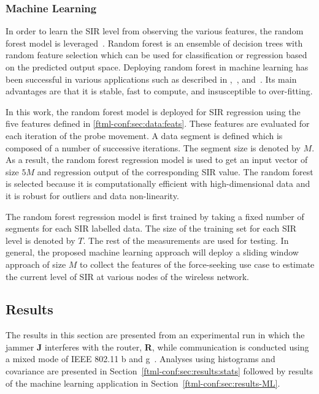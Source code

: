 \subsubsection{Machine Learning}\label{ftml-conf:sec:data:ML}
In order to learn the SIR level from observing the various features, the random forest model is leveraged~\cite{Breiman2001}. Random forest is an ensemble of decision trees with random feature selection which can be used for classification or regression based on the predicted output space. Deploying random forest in machine learning has been successful in various applications such as described in \cite{Zhen2015},~\cite{Shotton2011}, and~\cite{Zhen2014}. Its main advantages are that it is stable, fast to compute, and insusceptible to over-fitting.

In this work, the random forest model is deployed for SIR regression using the five features defined in \ref{ftml-conf:sec:data:feats}. These features are evaluated for each iteration of the probe movement. A data segment is defined which is composed of a number of successive iterations.  The segment size is denoted by $M$. As a result, the random forest regression model is used to get an input vector of size $5M$ and regression output of the corresponding SIR value. The random forest is selected because it is computationally efficient with high-dimensional data and it is robust for outliers and data non-linearity. 

The random forest regression model is first trained by taking a fixed number of segments for each SIR labelled data. The size of the training set for each SIR level is denoted by $T$. The rest of the measurements are used for testing. In general, the proposed machine learning approach will deploy a sliding window approach of size $M$ to collect the features of the force-seeking use case to estimate the current level of SIR at various nodes of the wireless network. 

\subsection{Results} \label{ftml-conf:sec:results}  

The results in this section are  presented from an experimental run in which the jammer \textbf{J} interferes with the router, \textbf{R}, while communication is conducted using a mixed mode of IEEE 802.11 b and g~\cite{IEEE802.11ac}.  Analyses using histograms and covariance are presented in Section~\ref{ftml-conf:sec:results:stats} followed by results of the machine learning application in Section~\ref{ftml-conf:sec:results-ML}.

